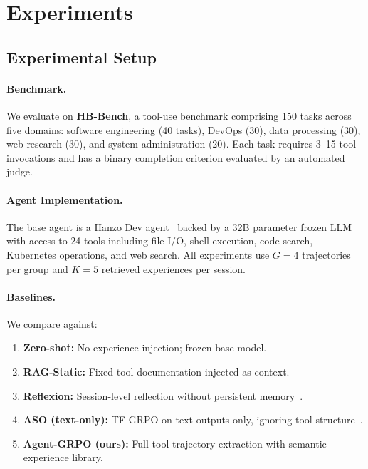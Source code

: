 \section{Experiments}

\label{sec:experiments}

\subsection{Experimental Setup}

\paragraph{Benchmark.}
We evaluate on \textbf{HB-Bench}, a tool-use benchmark comprising 150 tasks
across five domains: software engineering (40 tasks), DevOps (30), data
processing (30), web research (30), and system administration (20). Each task
requires 3--15 tool invocations and has a binary completion criterion evaluated
by an automated judge.

\paragraph{Agent Implementation.}
The base agent is a Hanzo Dev agent~\cite{hanzo2026aso} backed by a 32B
parameter frozen LLM with access to 24 tools including file I/O, shell
execution, code search, Kubernetes operations, and web search. All experiments
use $G = 4$ trajectories per group and $K = 5$ retrieved experiences per
session.

\paragraph{Baselines.}
We compare against:
\begin{enumerate}[leftmargin=1.5em]
    \item \textbf{Zero-shot:} No experience injection; frozen base model.
    \item \textbf{RAG-Static:} Fixed tool documentation injected as context.
    \item \textbf{Reflexion:} Session-level reflection without persistent memory~\cite{shinn2023reflexion}.
    \item \textbf{ASO (text-only):} TF-GRPO on text outputs only, ignoring
          tool structure~\cite{hanzo2026aso}.
    \item \textbf{Agent-GRPO (ours):} Full tool trajectory extraction with
          semantic experience library.
\end{enumerate}

